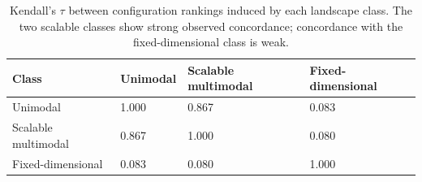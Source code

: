 \begin{table}[h]
\centering
\caption{Kendall's $\tau$ between configuration rankings induced by each landscape class. The two scalable classes show strong observed concordance; concordance with the fixed-dimensional class is weak.}
\label{tab:kendall_class}
\begin{tabular}{llll}
\toprule
Class & Unimodal & Scalable multimodal & Fixed-dimensional \\
\midrule
Unimodal & 1.000 & 0.867 & 0.083 \\
Scalable multimodal & 0.867 & 1.000 & 0.080 \\
Fixed-dimensional & 0.083 & 0.080 & 1.000 \\
\bottomrule
\end{tabular}
\end{table}
